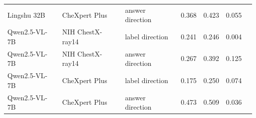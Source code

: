 \begin{table}[htbp]
\begin{tabular}{lllcccc}
Lingshu 32B & CheXpert Plus & answer direction & 0.368 & 0.423 & 0.055 & \\
Qwen2.5-VL-7B & NIH ChestX-ray14 & label direction & 0.241 & 0.246 & 0.004 & \\
Qwen2.5-VL-7B & NIH ChestX-ray14 & answer direction & 0.267 & 0.392 & 0.125 & \\
Qwen2.5-VL-7B & CheXpert Plus & label direction & 0.175 & 0.250 & 0.074 & \\
Qwen2.5-VL-7B & CheXpert Plus & answer direction & 0.473 & 0.509 & 0.036 & \\
\bottomrule
\end{tabular}
\end{table}
